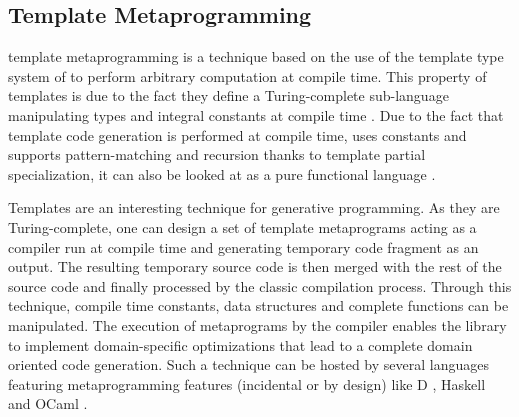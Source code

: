 \documentclass[../main]{subfiles}
\begin{document}
%
%
%


\subsection{
  Template Metaprogramming
}

\cpp template metaprogramming \cite{abrahams:2004} is a technique based on the
use of the template type system of \cpp to perform arbitrary computation at
compile time. This property of \cpp templates is due to the fact they
define a Turing-complete sub-language manipulating types and integral constants
at compile time \cite{unruh:1994}. Due to the fact that template code generation
is performed at compile time, uses constants and supports pattern-matching and
recursion thanks to template partial specialization, it can also be looked
at as a pure functional language \cite{haeri:2012}.

Templates are an interesting technique for generative programming. As they
are Turing-complete, one can design a set of template metaprograms acting as a
\dsl compiler run at compile time and generating temporary \cpp code fragment as
an output. The resulting temporary source code is then merged with the rest of
the source code and finally processed by the classic compilation process.
Through this technique, compile time constants, data structures and complete
functions can be manipulated. The execution of metaprograms by the compiler
enables the library to implement domain-specific optimizations that lead to a
complete domain oriented code generation. Such a technique can be hosted by
several languages featuring metaprogramming features (incidental or by design)
like D \cite{template:dlang}, Haskell \cite{sheard:2002} and
OCaml \cite{serot:2008}.
\end{document}

